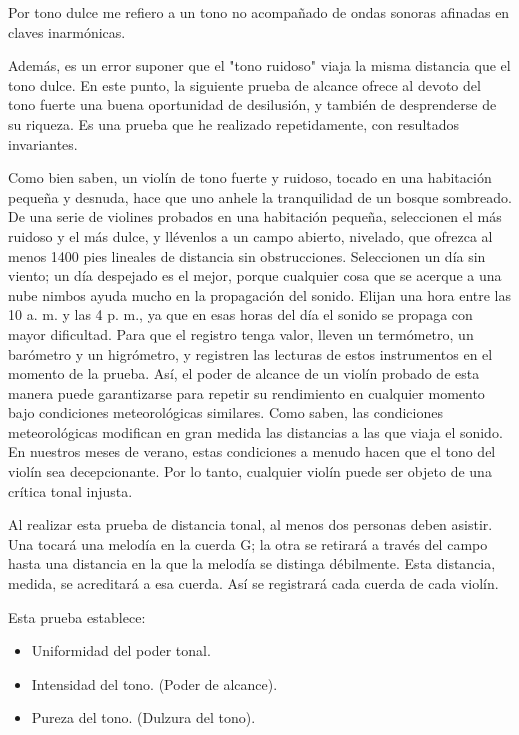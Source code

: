 \documentclass[12pt]{book}
\begin{document}
Por tono dulce me refiero a un tono no acompañado de ondas sonoras afinadas en claves inarmónicas.

Además, es un error suponer que el "tono ruidoso" viaja la misma distancia que el tono dulce. En este punto, la siguiente prueba de alcance ofrece al devoto del tono fuerte una buena oportunidad de desilusión, y también de desprenderse de su riqueza. Es una prueba que he realizado repetidamente, con resultados invariantes.

Como bien saben, un violín de tono fuerte y ruidoso, tocado en una habitación pequeña y desnuda, hace que uno anhele la tranquilidad de un bosque sombreado. De una serie de violines probados en una habitación pequeña, seleccionen el más ruidoso y el más dulce, y llévenlos a un campo abierto, nivelado, que ofrezca al menos 1400 pies lineales de distancia sin obstrucciones. Seleccionen un día sin viento; un día despejado es el mejor, porque cualquier cosa que se acerque a una nube nimbos ayuda mucho en la propagación del sonido. Elijan una hora entre las 10 a. m. y las 4 p. m., ya que en esas horas del día el sonido se propaga con mayor dificultad. Para que el registro tenga valor, lleven un termómetro, un barómetro y un higrómetro, y registren las lecturas de estos instrumentos en el momento de la prueba. Así, el poder de alcance de un violín probado de esta manera puede garantizarse para repetir su rendimiento en cualquier momento bajo condiciones meteorológicas similares. Como saben, las condiciones meteorológicas modifican en gran medida las distancias a las que viaja el sonido. En nuestros meses de verano, estas condiciones a menudo hacen que el tono del violín sea decepcionante. Por lo tanto, cualquier violín puede ser objeto de una crítica tonal injusta.

Al realizar esta prueba de distancia tonal, al menos dos personas deben asistir.
Una tocará una melodía en la cuerda G; la otra se retirará a través del campo hasta una distancia en la que la melodía se distinga débilmente. Esta distancia, medida, se acreditará a esa cuerda. Así se registrará cada cuerda de cada violín.

Esta prueba establece:
\begin{itemize}
 \item Uniformidad del poder tonal.
 \item Intensidad del tono. (Poder de alcance).
 \item Pureza del tono. (Dulzura del tono).
\end{itemize}
\end{document}
